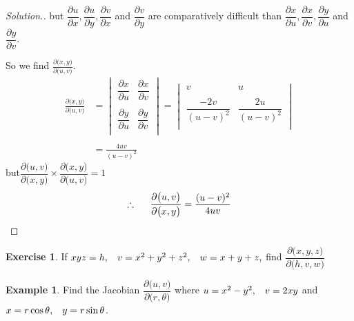 \documentclass[11pt,a4paper]{article}
\theoremstyle{definition}
\newtheorem{exa}[thm]{Example}
\newtheorem{exe}[thm]{Exercise}
\newenvironment{solution}
  {\renewcommand{\qedsymbol}{}\begin{proof}[\textit{Solution}.]}
  {\end{proof}}
\begin{document}
\begin{solution}
but $\dfrac{\partial u}{\partial x}, \dfrac{\partial u}{\partial y}, \dfrac{\partial v}{\partial x}$ and $\dfrac{\partial v}{\partial y}$ are comparatively difficult  than $\dfrac{\partial x}{\partial u}, \dfrac{\partial x}{\partial v}, \dfrac{\partial y}{\partial u}$ and $\dfrac{\partial y}{\partial v}$.

 So we find $\frac{\partial \big(x,y\big)}{\partial\big(u,v\big)}$.
\begin{align*}
\frac{\partial \big(x,y\big)}{\partial\big(u,v\big)} & =\begin{vmatrix}
\dfrac{\partial x}{\partial u} & \dfrac{\partial x}{\partial v}\\\\
\dfrac{\partial y}{\partial u} & \dfrac{\partial y}{\partial v}\\
\end{vmatrix}=
\begin{vmatrix}
v & u\\\\
\dfrac{-2v}{(u-v)^2} & \dfrac{2u}{(u-v)^2}\\
\end{vmatrix}\\\\
& = \frac{4uv}{(u -v)^2}
\end{align*}
but\hspace{0.5cm}$\dfrac{\partial \big(u,v\big)}{\partial\big(x,y\big)}\times \dfrac{\partial \big(x,y\big)}{\partial\big(u,v\big)}=1$
$$\therefore\hspace{0.5cm}\frac{\partial \big(u,v\big)}{\partial\big(x,y\big)} = \frac{(u -v)^2}{4uv}$$
\end{solution}

\begin{exe}
If $xyz =h,\hspace{0.3cm} v = x^2 + y^2 + z^2,\hspace{0.3cm} w = x+y+z,$ find $\dfrac{\partial \big(x,y,z\big)}{\partial\big(h,v,w\big)}$
\end{exe}

\begin{exa}
Find the Jacobian $\dfrac{\partial \big(u,v\big)}{\partial \big(r,\theta\big)}$ where $u = x^2 - y^2,\hspace{0.3cm} v = 2xy$ and $x = r\cos \theta,\hspace{0.3cm} y = r\sin \theta$.
\end{exa}
\end{document}
